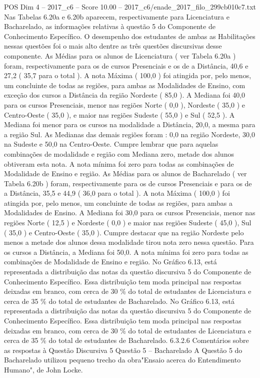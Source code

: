 \begin{textsample}{POS Dim 4 – 2017\_c6 – Score 10.00 – 2017\_c6/enade\_2017\_filo\_299cb010c7.txt}
Nas Tabelas 6.20a e 6.20b aparecem, respectivamente para Licenciatura e Bacharelado, as informações relativas à questão 5 do Componente de Conhecimento Específico.
O desempenho dos estudantes de ambas as Habilitações nessas questões foi o mais alto dentre as três questões discursivas desse componente.
As Médias para os alunos de Licenciatura ( ver Tabela 6.20a ) foram, respectivamente para os de cursos Presenciais e os de a Distância, 40,6 e 27,2 ( 35,7 para o total ).
A nota Máxima ( 100,0 ) foi atingida por, pelo menos, um concluinte de todas as regiões, para ambas as Modalidades de Ensino, com exceção dos cursos a Distância da região Nordeste ( 85,0 ).
A Mediana foi 40,0 para os cursos Presenciais, menor nas regiões Norte ( 0,0 ), Nordeste ( 35,0 ) e Centro-Oeste ( 35,0 ), e maior nas regiões Sudeste ( 55,0 ) e Sul ( 52,5 ).
A Mediana foi menor para os cursos na modalidade a Distância, 20,0, a mesma para a região Sul.
As Medianas das demais regiões foram : 0,0 na região Nordeste, 30,0 na Sudeste e 50,0 na Centro-Oeste.
Cumpre lembrar que para aquelas combinações de modalidade e região com Mediana zero, metade dos alunos obtiveram esta nota.
A nota mínima foi zero para todas as combinações de Modalidade de Ensino e região.
As Médias para os alunos de Bacharelado ( ver Tabela 6.20b ) foram, respectivamente para os de cursos Presenciais e para os de a Distância, 35,5 e 44,9 ( 36,0 para o total ).
A nota Máxima ( 100,0 ) foi atingida por, pelo menos, um concluinte de todas as regiões, para ambas a Modalidades de Ensino.
A Mediana foi 30,0 para os cursos Presenciais, menor nas regiões Norte ( 12,5 ) e Nordeste ( 0,0 ) e maior nas regiões Sudeste ( 45,0 ), Sul ( 35,0 ) e Centro-Oeste ( 35,0 ).
Cumpre destacar que na região Nordeste pelo menos a metade dos alunos dessa modalidade tirou nota zero nessa questão.
Para os cursos a Distância, a Mediana foi 50,0.
A nota mínima foi zero para todas as combinações de Modalidade de Ensino e região.
No Gráfico 6.13, está representada a distribuição das notas da questão discursiva 5 do Componente de Conhecimento Específico.
Essa distribuição tem moda principal nas respostas deixadas em branco, com cerca de 30 \% do total de estudantes de Licenciatura e cerca de 35 \% do total de estudantes de Bacharelado.
No Gráfico 6.13, está representada a distribuição das notas da questão discursiva 5 do Componente de Conhecimento Específico.
Essa distribuição tem moda principal nas respostas deixadas em branco, com cerca de 30 \% do total de estudantes de Licenciatura e cerca de 35 \% do total de estudantes de Bacharelado. 6.3.2.6 Comentários sobre as respostas à Questão Discursiva 5 Questão 5 – Bacharelado A Questão 5 do Bacharelado utilizou pequeno trecho da obra"Ensaio acerca do Entendimento Humano", de John Locke.

\end{textsample}

